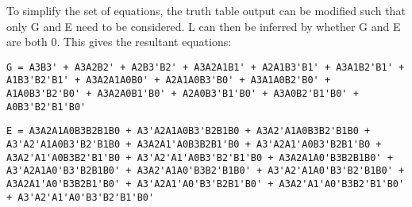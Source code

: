 To simplify the set of equations, the truth table output can be modified such that only G and E need to be considered. L can then be inferred by whether G and E are both 0.
This gives the resultant equations:
\vspace{11pt}

\begin{lstlisting}[label=boolequg, caption={`A > B' equations},captionpos=b]
G = A3B3' + A3A2B2' + A2B3'B2' + A3A2A1B1' + A2A1B3'B1' + A3A1B2'B1' + A1B3'B2'B1' + A3A2A1A0B0' + A2A1A0B3'B0' + A3A1A0B2'B0' + A1A0B3'B2'B0' + A3A2A0B1'B0' + A2A0B3'B1'B0' + A3A0B2'B1'B0' + A0B3'B2'B1'B0'
\end{lstlisting}

\begin{lstlisting}[label=booleque, caption={`A = B' equations},captionpos=b]
E = A3A2A1A0B3B2B1B0 + A3'A2A1A0B3'B2B1B0 + A3A2'A1A0B3B2'B1B0 + A3'A2'A1A0B3'B2'B1B0 + A3A2A1'A0B3B2B1'B0 + A3'A2A1'A0B3'B2B1'B0 + A3A2'A1'A0B3B2'B1'B0 + A3'A2'A1'A0B3'B2'B1'B0 + A3A2A1A0'B3B2B1B0' + A3'A2A1A0'B3'B2B1B0' + A3A2'A1A0'B3B2'B1B0' + A3'A2'A1A0'B3'B2'B1B0' + A3A2A1'A0'B3B2B1'B0' + A3'A2A1'A0'B3'B2B1'B0' + A3A2'A1'A0'B3B2'B1'B0' + A3'A2'A1'A0'B3'B2'B1'B0'
\end{lstlisting}


